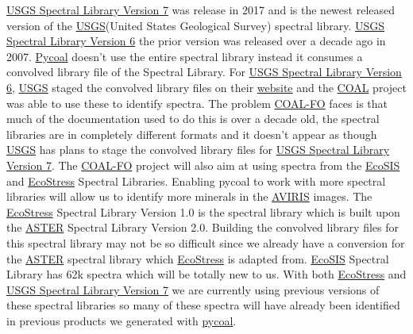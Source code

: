 \documentclass[a4paper,12pt]{article}
\begin{document}
\href{https://crustal.usgs.gov/speclab/QueryAll07a.php}{USGS Spectral Library Version 7} was release in 2017 and is the newest released version of the \href{https://www.usgs.gov/}{USGS}(United States Geological Survey) spectral library. \href{https://speclab.cr.usgs.gov/spectral.lib06/ds231/index.html}{USGS Spectral Library Version 6} the prior version was released over a decade ago in 2007. \href{https://github.com/capstone-coal/pycoal}{Pycoal} doesn’t use the entire spectral library instead it consumes a convolved library file of the Spectral Library. For \href{https://speclab.cr.usgs.gov/spectral.lib06/ds231/index.html}{USGS Spectral Library Version 6}, \href{https://www.usgs.gov/}{USGS} staged the convolved library files on their \href{ftp://ftpext.cr.usgs.gov/pub/cr/co/denver/speclab/pub/spectral.library/splib06.library/Convolved.libraries/}{website} and the \href{https://capstone-coal.github.io/}{COAL} project was able to use these to identify spectra. The problem \href{https://capstone-coal.github.io/team}{COAL-FO} faces is that much of the documentation used to do this is over a decade old, the spectral libraries are in completely different formats and it doesn’t appear as though \href{https://www.usgs.gov/}{USGS} has plans to stage the convolved library files for \href{https://crustal.usgs.gov/speclab/QueryAll07a.php}{USGS Spectral Library Version 7}.\newline
\newline
The \href{https://capstone-coal.github.io/team}{COAL-FO} project will also aim at using spectra from the \href{https://ecosis.org/}{EcoSIS} and \href{https://speclib.jpl.nasa.gov/}{EcoStress} Spectral Libraries. Enabling pycoal to work with more spectral libraries will allow us to identify more minerals in the \href{https://aviris.jpl.nasa.gov/}{AVIRIS} images. The \href{https://speclib.jpl.nasa.gov/}{EcoStress} Spectral Library Version 1.0 is the spectral library which is built upon the \href{https://speclib.jpl.nasa.gov/downloads/2009-Baldridge.pdf}{ASTER} Spectral Library Version 2.0. Building the convolved library files for this spectral library may not be so difficult since we already have a conversion for the \href{https://speclib.jpl.nasa.gov/downloads/2009-Baldridge.pdf}{ASTER} spectral library which \href{https://speclib.jpl.nasa.gov/}{EcoStress} is adapted from.
\href{https://ecosis.org/}{EcoSIS} Spectral Library has 62k spectra which will be totally new to us. With both \href{https://speclib.jpl.nasa.gov/}{EcoStress} and \href{https://crustal.usgs.gov/speclab/QueryAll07a.php}{USGS Spectral Library Version 7} we are currently using previous versions of these spectral libraries so many of these spectra will have already been identified in previous products we generated with \href{https://github.com/capstone-coal/pycoal}{pycoal}. \newline
\end{document}
